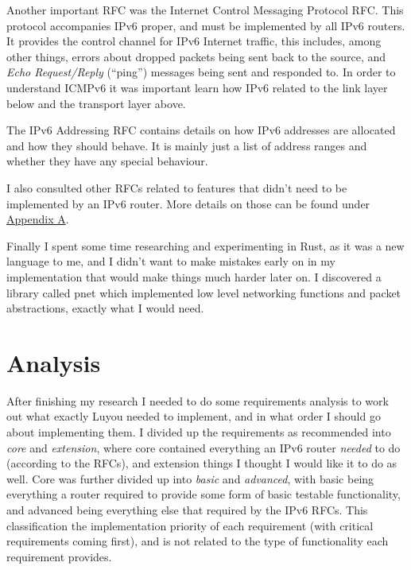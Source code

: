 \documentclass[12pt,a4paper,twoside,openany]{report}
\begin{document}
\bigskip

Another important RFC was the Internet Control Messaging Protocol RFC\cite{icmpv6_rfc}.  This protocol accompanies IPv6 proper, and must be implemented by all IPv6 routers.  It provides the control channel for IPv6 Internet traffic, this includes, among other things, errors about dropped packets being sent back to the source, and \textit{Echo Request/Reply} (``ping'') messages being sent and responded to.  In order to understand ICMPv6 it was important learn how IPv6 related to the link layer below and the transport layer above.

\bigskip

The IPv6 Addressing RFC\cite{ipv6_rfc_adr} contains details on how IPv6 addresses are allocated and how they should behave. It is mainly just a list of address ranges and whether they have any special behaviour.  

I also consulted other RFCs related to features that didn't need to be implemented by an IPv6 router\cite{dhcpv6_rfc}\cite{slaac_rfc}\cite{ndp_rfc}. More details on those can be found under \hyperref[appendix::requirements]{Appendix A}.

\bigskip

Finally I spent some time researching and experimenting in Rust\cite{rust}, as it was a new language to me, and I didn't want to make mistakes early on in my implementation that would make things much harder later on.  I discovered a library called pnet\cite{pnet_rust} which implemented low level networking functions and packet abstractions, exactly what I would need.

\section{Analysis}
\label{sec::analysis}

After finishing my research I needed to do some requirements analysis to work out what exactly Luyou needed to implement, and in what order I should go about implementing them.  I divided up the requirements as recommended into \textit{core} and \textit{extension}, where core contained everything an IPv6 router \textit{needed} to do (according to the RFCs), and extension things I thought I would like it to do as well.  Core was further divided up into \textit{basic} and \textit{advanced}, with basic being everything a router required to provide some form of basic testable functionality, and advanced being everything else that required by the IPv6 RFCs.  This classification the implementation priority of each requirement (with critical requirements coming first), and is not related to the type of functionality each requirement provides.
\end{document}
